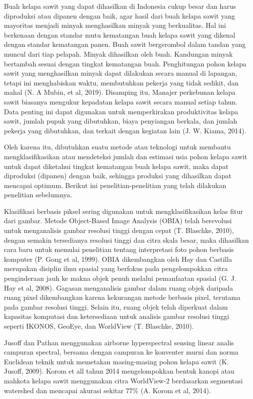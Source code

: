 Buah kelapa sawit yang dapat dihasilkan di Indonesia cukup besar dan harus diproduksi atau dipanen dengan baik, agar hasil dari buah kelapa sawit yang mayoritas menjadi minyak menghasilkan minyak yang berkualitas. Hal ini berkenaan dengan standar mutu kematangan buah kelapa sawit yang dikenal dengan standar kematangan panen. Buah sawit bergerombol dalam tandan yang muncul dari tiap pelapah. Minyak dihasilkan oleh buah. Kandungan minyak bertambah sesuai dengan tingkat kematangan buah. Penghitungan pohon kelapa sawit yang menghasilkan minyak dapat dilakukan secara manual di lapangan, tetapi ini menghabiskan waktu, membutuhkan pekerja yang tidak sedikit, dan mahal (N. A Mubin, et al, 2019). Disamping itu, Manajer perkebunan kelapa sawit biasanya mengukur kepadatan kelapa sawit secara manual setiap tahun. Data penting ini dapat digunakan untuk memperkirakan produktivitas kelapa sawit, jumlah pupuk yang dibutuhkan, biaya penyiangan berkala, dan jumlah pekerja yang dibutuhkan, dan terkait dengan kegiatan lain (J. W. Kiama, 2014).

Oleh karena itu, dibutuhkan suatu metode atau teknologi untuk membantu mengklasifikasikan atau mendeteksi jumlah dan estimasi usia pohon kelapa sawit untuk dapat diketahui tingkat kematangan buah kelapa sawit, maka dapat diproduksi (dipanen) dengan baik, sehingga produksi yang dihasilkan dapat mencapai optimum. Berikut ini penelitian-penelitian yang telah dilakukan penelitian sebelumnya.

Klasifikasi berbasis piksel sering digunakan untuk mengklasifikasikan kelas fitur dari gambar. Metode Object-Based Image Analysis (OBIA) telah berevolusi untuk menganalisis gambar resolusi tinggi dengan cepat (T. Blaschke, 2010), dengan semakin tersedianya resolusi tinggi dan citra skala besar, maka dihasilkan cara baru untuk memulai penelitian tentang interpretasi foto pohon berbasis komputer (P. Gong et al, 1999). OBIA dikembangkan oleh Hay dan Castilla merupakan disiplin ilmu spasial yang berfokus pada pengelompokkan citra penginderaan jauh ke makna objek penuh melalui pemanfaatan spasial (G. J. Hay et al, 2008). Gagasan menganalisis gambar dalam ruang objek daripada ruang pixel dikembangkan karena kekurangan metode berbasis pixel, terutama pada gambar resolusi tinggi. Selain itu, ruang objek telah diperkuat dalam kapasitas komputasi dan ketersediaan untuk analisis gambar resolusi tinggi seperti IKONOS, GeoEye, dan WorldView (T. Blaschke, 2010).

Jusoff dan Pathan menggunakan airborne hyperspectral sensing linear analis campuran spectral, bersama dengan campuran ke konventer murni dan norma Euclidean teknik untuk memetakan masing-masing pohon kelapa sawit (K. Jusoff, 2009). Korom et all tahun 2014 mengelompokkan bentuk kanopi atau mahkota kelapa sawit menggunakan citra WorldView-2 berdasarkan segmentasi watershed dan mencapai akurasi sekitar 77\% (A. Korom et al, 2014).

